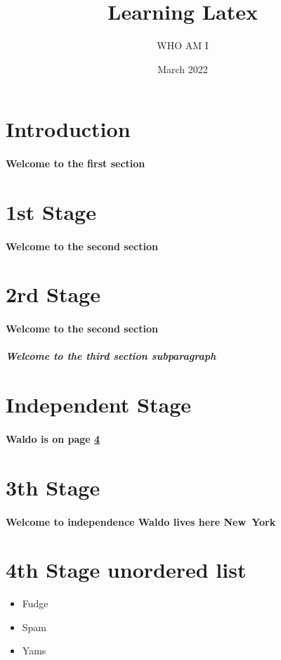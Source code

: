 \documentclass[12pt,letterpaper,titlepage]{article}
\title{Learning Latex}
\author{WHO AM I}
\date{March 2022}
\newcommand{\currentState}{New\ York} %
\begin{document}
        \maketitle
        \tableofcontents
        \clearpage
        \section{Introduction}
            \paragraph{Welcome to the first section}
        \section{1st Stage}
            \paragraph{Welcome to the second section}
        \section[Alias of 2rd Stage]{2rd Stage}
            \paragraph{Welcome to the second section}
                \subparagraph{Welcome to the third section subparagraph}
        \section*{Independent Stage} %
            \paragraph{\bf Waldo is on page \ref{waldoReF}}
        \section[Alias of 3th Stage]{3th Stage}
            \label{waldoReF}
            \paragraph{\bf Welcome to independence Waldo lives here \currentState }
        \section {4th Stage unordered list}
            \begin{itemize}
                \item Fudge
                \item Spam
                \item Yams
            \end{itemize}
\end{document}
